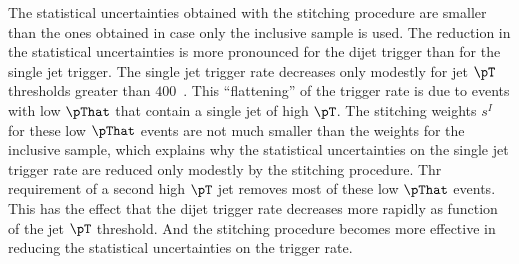 The statistical uncertainties obtained with the stitching procedure are smaller than the ones obtained in case only the inclusive sample is used.
The reduction in the statistical uncertainties is more pronounced for the dijet trigger than for the single jet trigger.
The single jet trigger rate decreases only modestly for jet $\pT$ thresholds greater than $400$~\GeV.
This ``flattening'' of the trigger rate is due to events with low $\pThat$ that contain a single jet of high $\pT$.
The stitching weights $s^{I}$ for these low $\pThat$ events are not much smaller than the weights for the inclusive sample,
which explains why the statistical uncertainties on the single jet trigger rate are reduced only modestly by the stitching procedure.
Thr requirement of a second high $\pT$ jet removes most of these low $\pThat$ events.
This has the effect that the dijet trigger rate decreases more rapidly as function of the jet $\pT$ threshold.
And the stitching procedure becomes more effective in reducing the statistical uncertainties on the trigger rate.
